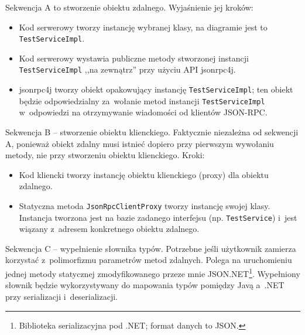 Sekwencja A to stworzenie obiektu zdalnego. Wyjaśnienie jej kroków:
\begin{itemize}
	\item Kod serwerowy tworzy instancję wybranej klasy, na diagramie jest to \texttt{TestServiceImpl}.
	\item Kod serwerowy wystawia publiczne metody stworzonej instancji \texttt{TestServiceImpl} ,,na zewnątrz'' przy użyciu API jsonrpc4j.
	\item jsonrpc4j tworzy obiekt opakowujący instancję \texttt{TestServiceImpl}; ten obiekt będzie odpowiedzialny za~wołanie metod instancji \texttt{TestServiceImpl} w~odpowiedzi na otrzymywanie wiadomości od klientów JSON-RPC.
\end{itemize}

Sekwencja B -- stworzenie obiektu klienckiego. Faktycznie niezależna od sekwencji A, ponieważ obiekt zdalny musi istnieć dopiero przy pierwszym wywołaniu metody, nie przy stworzeniu obiektu klienckiego. Kroki:
\begin{itemize}
	\item Kod kliencki tworzy instancję obiektu klienckiego (proxy) dla obiektu zdalnego.
	\item Statyczna metoda \texttt{JsonRpcClientProxy} tworzy instancję swojej klasy. Instancja tworzona jest na bazie zadanego interfejsu (np. \texttt{TestService}) i~jest wiązany z~adresem konkretnego obiektu zdalnego.
\end{itemize}

Sekwencja C -- wypełnienie słownika typów. Potrzebne jeśli użytkownik zamierza korzystać z~polimorfizmu parametrów metod zdalnych. Polega na uruchomieniu jednej metody statycznej zmodyfikowanego przeze mnie JSON.NET\footnote{Biblioteka serializacyjna pod .NET; format danych to JSON.}. Wypełniony słownik będzie wykorzystywany do mapowania typów pomiędzy Javą a~.NET przy serializacji i~deserializacji.

